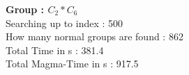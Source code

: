 \textbf{Group : $C_2*C_6$}\\
Searching up to index : 500\\
How many normal groups are found : 862\\
Total Time in s : 381.4\\
Total Magma-Time in s : 917.5\\
